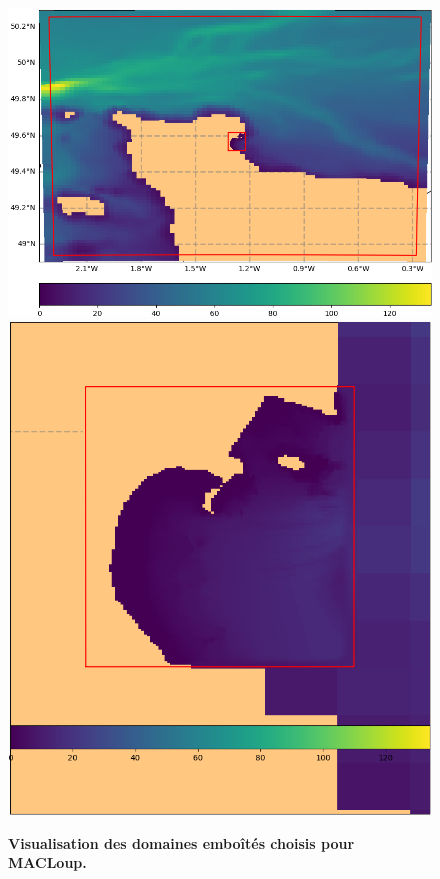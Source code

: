 \documentclass[10pt,a4paper,titlepage]{article}
\begin{document}
\begin{figure}[H]
    \centering
    \includegraphics[scale=0.4]{../images/COTENTIN_ADCL5.png}
    \includegraphics[scale=0.27]{../images/ADCL5.png}
    \caption{
        \textbf{Visualisation des domaines emboîtés choisis pour MACLoup.}\\
}
\end{figure}
\end{document}
